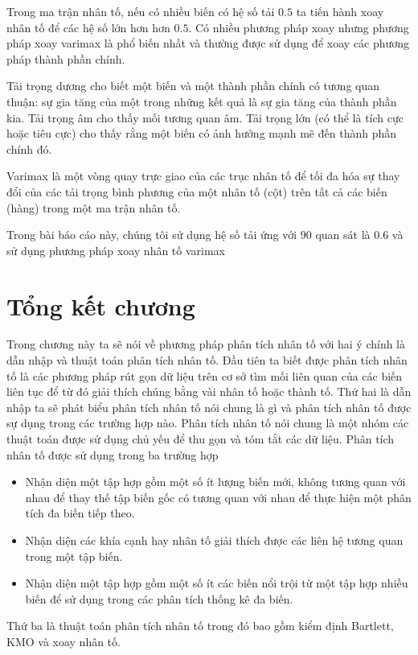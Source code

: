 \documentclass[../thesis.tex]{subfiles}
\begin{document}
Trong ma trận nhân tố, nếu có nhiều biến có hệ số tải $ 0.5 $ ta tiến hành xoay nhân tố để các hệ số lớn hơn hơn $ 0.5 $. Có nhiều phương pháp xoay nhưng phương pháp xoay varimax là phổ biến nhất và thường được sử dụng để xoay các phương pháp thành phần chính.

Tải trọng dương cho biết một biến và một thành phần chính có tương quan thuận: sự gia tăng của một trong những kết quả là sự gia tăng của thành phần kia. Tải trọng âm cho thấy mối tương quan âm. Tải trọng lớn (có thể là tích cực hoặc tiêu cực) cho thấy rằng một biến có ảnh hưởng mạnh mẽ đến thành phần chính đó.

Varimax là một vòng quay trực giao của các trục nhân tố để tối đa hóa sự thay đổi của các tải trọng bình phương của một nhân tố (cột) trên tất cả các biến (hàng) trong một ma trận nhân tố.

Trong bài báo cáo này, chúng tôi sử dụng hệ số tải ứng với $ 90 $ quan sát là $ 0.6 $ và sử dụng phương pháp xoay nhân tố varimax 



\section*{Tổng kết chương}

Trong chương này ta sẽ nói về phương pháp phân tích nhân tố với hai ý chính là dẫn nhập và thuật toán phân tích nhân tố. 
Đầu tiên ta biết được phân tích nhân tố là các phương pháp rút gọn dữ liệu trên cơ sở tìm mối liên quan của các biến liên tục để từ đó giải thích chúng bằng vài nhân tố hoặc thành tố.
Thứ hai là dẫn nhập ta sẽ phát biểu phân tích nhân tố nói chung là gì và phân tích nhân tố được sự dụng trong các trường hợp nào.
Phân tích nhân tố nói chung là một nhóm các thuật toán được sử dụng chủ yếu để thu gọn và tóm tắt các dữ liệu. Phân tích nhân tố được sử dụng trong ba trường hợp

\begin{itemize}
	\item Nhận diện một tập hợp gồm một số ít lượng biến mới, không tương quan với nhau để thay thế tập biến gốc có tương quan với nhau để thực hiện một phân tích đa biến tiếp theo.
	\item Nhận diện các khía cạnh hay nhân tố giải thích được các liên hệ tương quan trong một tập biến.
	\item Nhận diện một tập hợp gồm một số ít các biến nổi trội từ một tập hợp nhiều biến để sử dụng trong các phân tích thống kê đa biến.
\end{itemize}

Thứ ba là thuật toán phân tích nhân tố trong đó bao gồm kiểm định Bartlett, KMO và xoay nhân tố.
\end{document}

